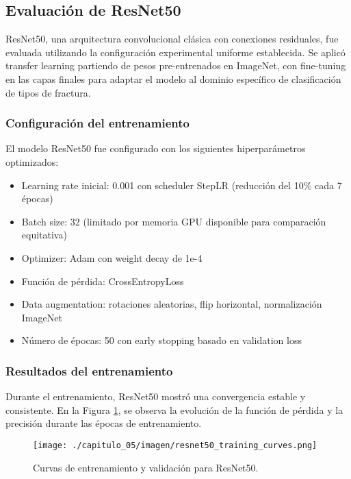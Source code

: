 \subsection{Evaluación de ResNet50}

ResNet50, una arquitectura convolucional clásica con conexiones residuales, fue evaluada utilizando la configuración experimental uniforme establecida. Se aplicó transfer learning partiendo de pesos pre-entrenados en ImageNet, con fine-tuning en las capas finales para adaptar el modelo al dominio específico de clasificación de tipos de fractura.

\subsubsection{Configuración del entrenamiento}

El modelo ResNet50 fue configurado con los siguientes hiperparámetros optimizados:

\begin{itemize}
\item Learning rate inicial: 0.001 con scheduler StepLR (reducción del 10\% cada 7 épocas)
\item Batch size: 32 (limitado por memoria GPU disponible para comparación equitativa)
\item Optimizer: Adam con weight decay de 1e-4
\item Función de pérdida: CrossEntropyLoss
\item Data augmentation: rotaciones aleatorias, flip horizontal, normalización ImageNet
\item Número de épocas: 50 con early stopping basado en validation loss
\end{itemize}

\subsubsection{Resultados del entrenamiento}

Durante el entrenamiento, ResNet50 mostró una convergencia estable y consistente. En la Figura \ref{fig:resnet_training}, se observa la evolución de la función de pérdida y la precisión durante las épocas de entrenamiento.

\begin{figure}[H]
\leavevmode
\begin{minipage}{\textwidth}
\begin{center}
\texttt{[image: ./capitulo\_05/imagen/resnet50\_training\_curves.png]}
\caption{Curvas de entrenamiento y validación para ResNet50.\label{fig:resnet_training}}
\end{center}
\end{minipage}
\end{figure}

